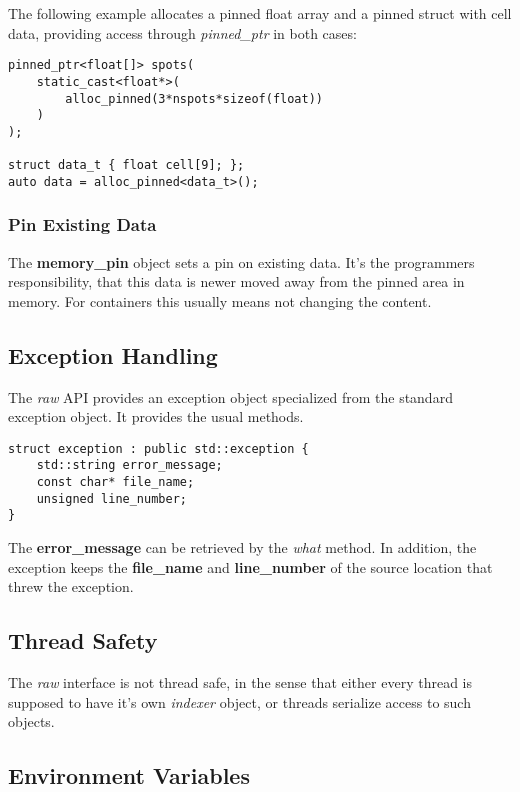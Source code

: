 \documentclass[a4paper,10pt]{article}
\begin{document}
The following example allocates a pinned float array and a pinned struct with cell data, providing access through \emph{pinned\_ptr} in both cases:
%
\begin{lstlisting}
pinned_ptr<float[]> spots(
    static_cast<float*>(
        alloc_pinned(3*nspots*sizeof(float))
    )
);

struct data_t { float cell[9]; };
auto data = alloc_pinned<data_t>();
\end{lstlisting}

\subsubsection{Pin Existing Data}

The \textbf{memory\_pin} object sets a pin on existing data. It's the programmers responsibility, that this data is newer moved away from the pinned area in memory. For containers this usually means not changing the content.

\subsection{Exception Handling}

The \emph{raw} API provides an exception object specialized from the standard exception object. It provides the usual methods.
%
\begin{lstlisting}
struct exception : public std::exception {
    std::string error_message;
    const char* file_name;
    unsigned line_number;
}
\end{lstlisting}
%
The \textbf{error\_message} can be retrieved by the \emph{what} method. In addition, the exception keeps the \textbf{file\_name} and \textbf{line\_number} of the source location that threw the exception.

\subsection{Thread Safety}

The \emph{raw} interface is not thread safe, in the sense that either every thread is supposed to have it's own \emph{indexer} object, or threads serialize access to such objects.

\subsection{Environment Variables}
\end{document}
